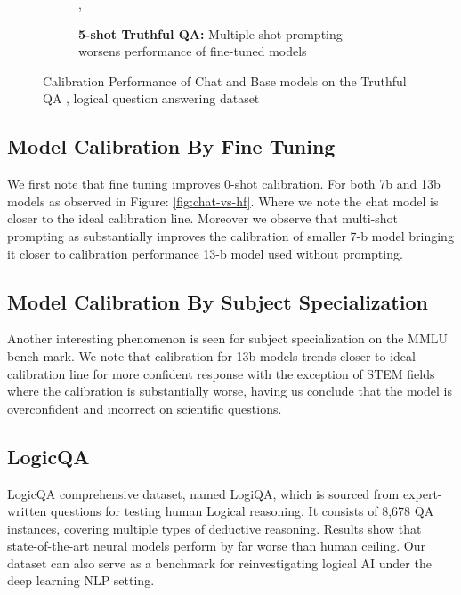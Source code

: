 \documentclass[11pt]{article}
\begin{document}
\begin{figure}
\begin{subfigure}[b]{0.49\textwidth}
             \caption{\textbf{5-shot Truthful QA:}  Multiple shot prompting worsens performance of fine-tuned models},
             \label{fig:0-shot-MMLU}
        \end{subfigure} 
         
         
     
        \caption{Calibration Performance of Chat and Base models on the Truthful QA , logical question answering dataset}
        \label{fig:three graphs}
\end{figure}



\subsection{Model Calibration By Fine Tuning}  

We first note that fine tuning improves 0-shot calibration. For both 7b and 13b models as observed in 
Figure: \ref{fig:chat-vs-hf}. Where we note the chat model is closer to the ideal calibration line. Moreover we observe that 
multi-shot prompting as substantially improves the calibration of smaller 7-b model bringing it closer to calibration performance 13-b model used without prompting.


\subsection{Model Calibration By Subject Specialization}  

Another interesting phenomenon is seen for subject specialization on the MMLU bench mark. We note that calibration for 13b models  trends closer to ideal calibration line for more confident response with the exception of STEM fields where the calibration is substantially worse, having us conclude that the model 
is overconfident and incorrect on scientific questions.


\subsection{LogicQA}

LogicQA comprehensive dataset, named LogiQA, which is sourced from expert-written questions for testing human Logical reasoning. It consists of 8,678 QA instances, covering multiple types of deductive reasoning. Results show that state-of-the-art neural models perform by far worse than human ceiling. Our dataset can also serve as a benchmark for reinvestigating logical AI under the deep learning NLP setting. 
\end{document}
